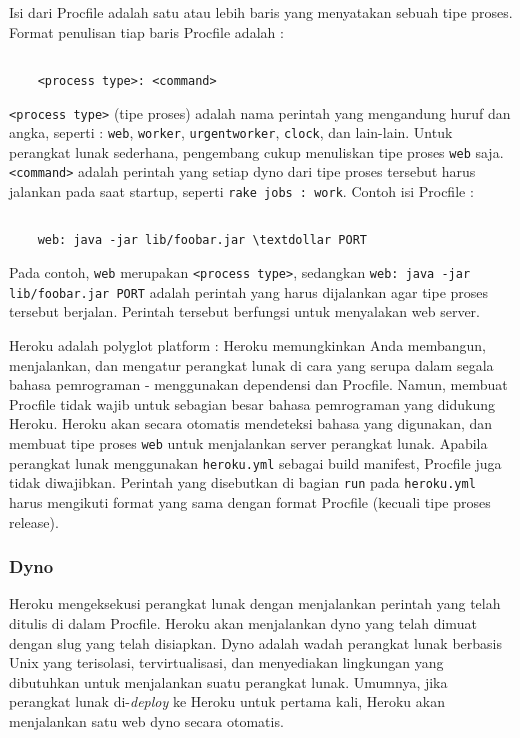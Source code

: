 Isi dari Procfile adalah satu atau lebih baris yang menyatakan sebuah tipe proses. Format penulisan tiap baris Procfile adalah : 
\begin{lstlisting}

	<process type>: <command>

\end{lstlisting}
\texttt{<process type>} (tipe proses) adalah nama perintah yang mengandung huruf dan angka, seperti : \texttt{web}, \texttt{worker}, \texttt{urgentworker}, \texttt{clock}, dan lain-lain. Untuk perangkat lunak sederhana, pengembang cukup menuliskan tipe proses \texttt{web} saja. \texttt{<command>} adalah perintah yang setiap dyno dari tipe proses tersebut harus jalankan pada saat startup, seperti \texttt{rake jobs : work}. Contoh isi Procfile :
\begin{lstlisting}

	web: java -jar lib/foobar.jar \textdollar PORT

\end{lstlisting}
Pada contoh, \texttt{web} merupakan \texttt{<process type>}, sedangkan \texttt{web: java -jar lib/foobar.jar \textdollar PORT} adalah perintah yang harus dijalankan agar tipe proses tersebut berjalan. Perintah tersebut berfungsi untuk menyalakan web server.

Heroku adalah polyglot platform : Heroku memungkinkan Anda membangun, menjalankan, dan mengatur perangkat lunak di cara yang serupa dalam segala bahasa pemrograman - menggunakan dependensi dan Procfile. Namun, membuat Procfile tidak wajib untuk sebagian besar bahasa pemrograman yang didukung Heroku. Heroku akan secara otomatis mendeteksi bahasa yang digunakan, dan membuat tipe proses \texttt{web} untuk menjalankan server perangkat lunak. Apabila perangkat lunak menggunakan \texttt{heroku.yml} sebagai build manifest, Procfile juga tidak diwajibkan. Perintah yang disebutkan di bagian \texttt{run} pada \texttt{heroku.yml} harus mengikuti format yang sama dengan format Procfile (kecuali tipe proses release).

\subsubsection{Dyno}
Heroku mengeksekusi perangkat lunak dengan menjalankan perintah yang telah ditulis di dalam Procfile. Heroku akan menjalankan dyno yang telah dimuat dengan slug yang telah disiapkan. Dyno adalah wadah perangkat lunak berbasis Unix yang terisolasi, tervirtualisasi, dan menyediakan lingkungan yang dibutuhkan untuk menjalankan suatu perangkat lunak. Umumnya, jika perangkat lunak di-\textit{deploy} ke Heroku untuk pertama kali, Heroku akan menjalankan satu web dyno secara otomatis.

